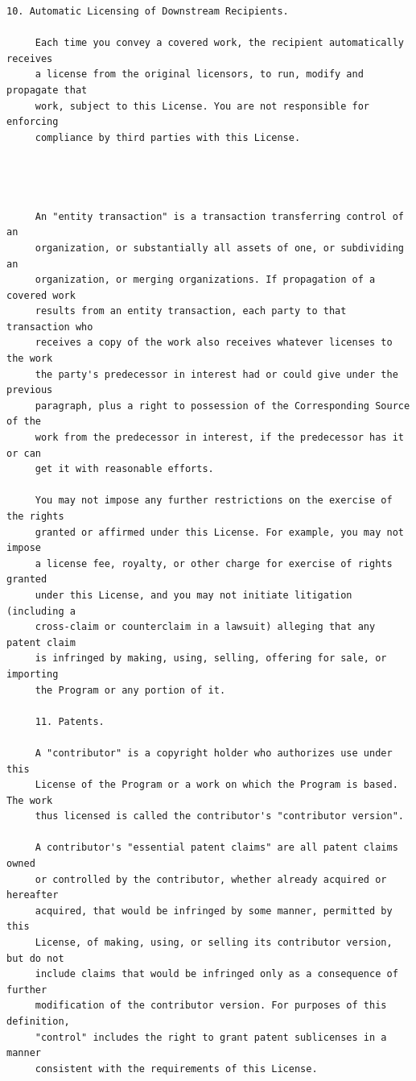 \begin{lstlisting}[basicstyle=\ttfamily\footnotesize,breaklines=true]
     10. Automatic Licensing of Downstream Recipients.

     Each time you convey a covered work, the recipient automatically receives
     a license from the original licensors, to run, modify and propagate that
     work, subject to this License. You are not responsible for enforcing
     compliance by third parties with this License.




     An "entity transaction" is a transaction transferring control of an
     organization, or substantially all assets of one, or subdividing an
     organization, or merging organizations. If propagation of a covered work
     results from an entity transaction, each party to that transaction who
     receives a copy of the work also receives whatever licenses to the work
     the party's predecessor in interest had or could give under the previous
     paragraph, plus a right to possession of the Corresponding Source of the
     work from the predecessor in interest, if the predecessor has it or can
     get it with reasonable efforts.

     You may not impose any further restrictions on the exercise of the rights
     granted or affirmed under this License. For example, you may not impose
     a license fee, royalty, or other charge for exercise of rights granted
     under this License, and you may not initiate litigation (including a
     cross-claim or counterclaim in a lawsuit) alleging that any patent claim
     is infringed by making, using, selling, offering for sale, or importing
     the Program or any portion of it.

     11. Patents.

     A "contributor" is a copyright holder who authorizes use under this
     License of the Program or a work on which the Program is based. The work
     thus licensed is called the contributor's "contributor version".

     A contributor's "essential patent claims" are all patent claims owned
     or controlled by the contributor, whether already acquired or hereafter
     acquired, that would be infringed by some manner, permitted by this
     License, of making, using, or selling its contributor version, but do not
     include claims that would be infringed only as a consequence of further
     modification of the contributor version. For purposes of this definition,
     "control" includes the right to grant patent sublicenses in a manner
     consistent with the requirements of this License.


\end{lstlisting}
